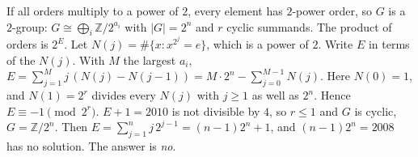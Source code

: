 \documentclass[11pt,a4paper]{article}
\begin{document}
 If all orders multiply to a power of $2$, every element has $2$-power order, so $G$ is a $2$-group: $G\cong\bigoplus_i\mathbb Z/2^{a_i}$ with $|G|=2^n$ and $r$ cyclic summands. The product of orders is $2^E$. Let $N(j)=\#\{x:x^{2^j}=e\}$, which is a power of $2$. Write $E$ in terms of the $N(j)$.
 With $M$ the largest $a_i$, $E=\sum_{j=1}^{M}j\,(N(j)-N(j-1))=M\cdot 2^n-\sum_{j=0}^{M-1}N(j)$. Here $N(0)=1$, and $N(1)=2^r$ divides every $N(j)$ with $j\ge1$ as well as $2^n$. Hence $E\equiv-1\pmod{2^r}$.
 $E+1=2010$ is not divisible by $4$, so $r\le1$ and $G$ is cyclic, $G=\mathbb Z/2^n$. Then $E=\sum_{j=1}^n j\,2^{j-1}=(n-1)2^n+1$, and $(n-1)2^n=2008$ has no solution. The answer is \emph{no}.
\end{document}

